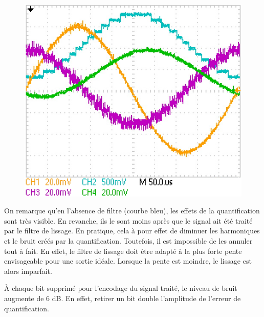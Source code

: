\documentclass{article}
\begin{document}
\begin{figure}[h]
	\centering
	\includegraphics[width=.4\textwidth]{data/TEK0016_}
	\caption{}
	\label{fig:liss}
\end{figure}

On remarque qu'en l'absence de filtre (courbe bleu), les effets de la quantification sont très visible. En revanche, ils le sont moins après que le signal ait été traité par le filtre de lissage. En pratique, cela à pour effet de diminuer les harmoniques et le bruit créés par la quantification. Toutefois, il est impossible de les annuler tout à fait. En effet, le filtre de lissage doit être adapté à la plus forte pente envisageable pour une sortie idéale. Lorsque la pente est moindre, le lissage est alors imparfait.


À chaque bit supprimé pour l'encodage du signal traité, le niveau de bruit augmente de 6 dB. En effet, retirer un bit double l'amplitude de l'erreur de quantification.
\end{document}
